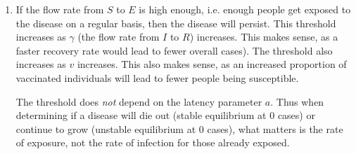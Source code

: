 \documentclass{article}
\begin{document}
\begin{enumerate}
\begin{enumerate}
		\item 
			If the flow rate from $S$ to $E$ is high enough, i.e. enough people get exposed to the disease on a regular basis, then the disease will persist. This threshold increases as $\gamma$ (the flow rate from $I$ to $R$) increases. This makes sense, as a faster recovery rate would lead to fewer overall cases). The threshold also increases as $v$ increases. This also makes sense, as an increased proportion of vaccinated individuals will lead to fewer people being susceptible.

			The threshold does \textit{not} depend on the latency parameter $a$. Thus when determining if a disease will die out (stable equilibrium at 0 cases) or continue to grow (unstable equilibrium at 0 cases), what matters is the rate of exposure, not the rate of infection for those already exposed.
	\end{enumerate}
\end{enumerate}	
\end{document}
